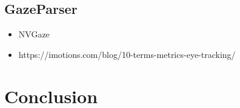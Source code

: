 \documentclass[12pt]{article}
\begin{document}
\subsection{GazeParser}



\begin{itemize}
  \item NVGaze
  \item https://imotions.com/blog/10-terms-metrics-eye-tracking/
\end{itemize}


\section{Conclusion}


\pagebreak


\end{document}
